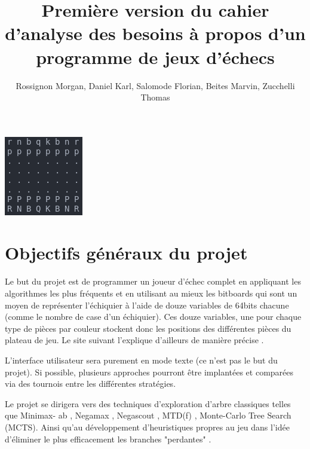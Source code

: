\documentclass{article}
\title{Première version du cahier d’analyse des besoins à propos d'un programme de jeux d'échecs}
\author{Rossignon Morgan, Daniel Karl, Salomode Florian, Beites Marvin, Zucchelli Thomas}
\begin{document}
\maketitle
\centerline{\includegraphics[scale = 1]{img/echecs_title.png}}

\tableofcontents
\newpage

\section{Objectifs généraux du projet}
Le but du projet est de programmer un joueur d'échec complet en appliquant les algorithmes les plus fréquents et en utilisant au mieux les bitboards qui sont un moyen de représenter l'échiquier à l'aide de douze variables de 64bits chacune (comme le nombre de case d'un échiquier). \newline
Ces  douze variables, une pour chaque type de pièces par couleur stockent donc les positions des différentes pièces du plateau de jeu. Le site suivant l'explique d'ailleurs de manière précise \cite{Bitboards}. 

L'interface utilisateur sera purement en mode texte (ce n'est pas le but du projet). Si possible, plusieurs approches pourront être implantées et comparées via des tournois entre les différentes stratégies.

Le projet se dirigera vers des techniques d'exploration d'arbre classiques telles que Minimax-
ab \cite{Minmax-ab}, Negamax \cite{Negamax}, Negascout \cite{Negascout}, MTD(f) \cite{MTD(f)}, Monte-Carlo Tree Search (MCTS)\cite{MCTS}. Ainsi qu'au développement d'heuristiques propres au jeu dans l'idée d'éliminer le plus efficacement les branches "perdantes" \cite{Heuristiques}.
\end{document}
